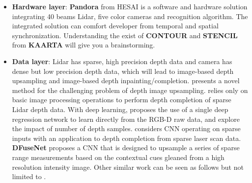 \documentclass[journal,transmag]{IEEEtran}
\begin{document}
\begin{itemize}
    \item \textbf{Hardware layer}: \textbf{Pandora} from HESAI is a software and hardware solution integrating 40 beams Lidar, five color cameras and recognition algorithm. The integrated solution can comfort developer from temporal and spatial synchronization. Understanding the exist of \textbf{CONTOUR} and \textbf{STENCIL} from \textbf{KAARTA} will give you a brainstorming.
    \item \textbf{Data layer}: Lidar has sparse, high precision depth data and camera has dense but low precision depth data, which will lead to image-based depth upsampling and image-based depth inpainting/completion. \cite{ferstl2013image} presents a novel method for the challenging problem of depth image upsampling. \cite{ku2018defense} relies only on basic image processing operations to perform depth completion of sparse Lidar depth data. With deep learning, \cite{mal2018sparse} proposes the use of a single deep regression network to learn directly from the RGB-D raw data, and explore the impact of number of depth samples. \cite{uhrig2017sparsity} considers CNN operating on sparse inputs with an application to depth completion from sparse laser scan data. \textbf{DFuseNet} \cite{shivakumar2019dfusenet} proposes a CNN that is designed to upsample a series of sparse range measurements based on the contextual cues gleaned from a high resolution intensity image. Other similar work can be seen as follows but not limited to \cite{chen2018estimating} \cite{eldesokey2018propagating}.

\end{itemize}
\end{document}
